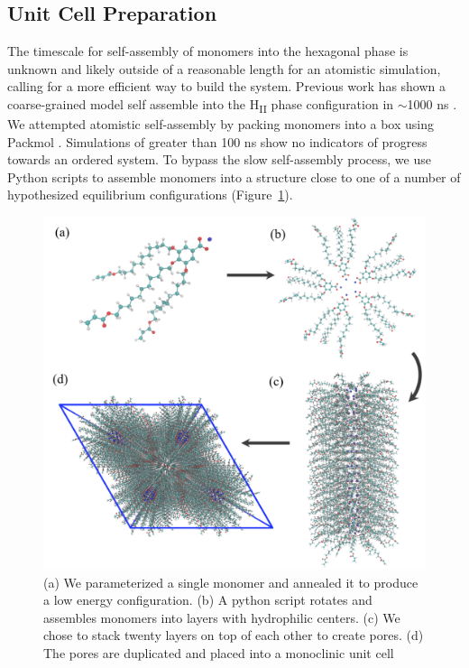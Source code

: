 \documentclass{article}
\begin{document}

  \subsection{Unit Cell Preparation}

  The timescale for self-assembly of monomers into the hexagonal phase is
  unknown and likely outside of a reasonable length for an atomistic simulation,
  calling for a more efficient way to build the system. Previous work has shown
  a coarse-grained model self assemble into the H\textsubscript{II} phase
  configuration in $\sim$1000 ns \cite{mondal_self-assembly_2013}.  We
  attempted atomistic self-assembly by packing monomers into a box using Packmol
  \cite{martinez_packmol:_2009}.  Simulations of greater than 100 ns show no
  indicators of progress towards an ordered system. To bypass the slow
  self-assembly process, we use Python scripts to assemble monomers into a
  structure close to one of a number of hypothesized equilibrium configurations
  (Figure~\ref{fig:python}).

  \begin{figure}
	\centering
	\includegraphics[width=0.75\linewidth]{build.PNG} %
	\caption{(a) We parameterized a single monomer and annealed it to produce a low energy
		configuration. (b) A python script rotates and assembles monomers into layers with 
		hydrophilic centers. (c) We chose to stack twenty layers on top of each other to create
		pores. (d) The pores are duplicated and placed into a monoclinic unit cell}\label{fig:python}
  \end{figure}
  
\end{document}
